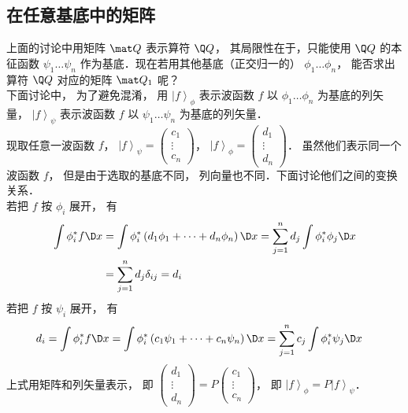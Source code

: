 \subsection{在任意基底中的矩阵}
上面的讨论中用矩阵 $\mat Q$ 表示算符 $\Q Q$， 其局限性在于，只能使用 $\Q Q$ 的本征函数 ${\psi _1}\dots{\psi _n}$ 作为基底．现在若用其他基底（正交归一的） ${\phi _1}\dots{\phi _n}$， 能否求出算符 $\Q Q$ 对应的矩阵 ${\mat Q_1}$ 呢？\\
下面讨论中， 为了避免混淆， 用 ${\left| f \right\rangle _\phi }$ 表示波函数 $f$ 以 ${\phi _1}\dots{\phi _n}$ 为基底的列矢量， ${\left| f \right\rangle _\psi }$ 表示波函数 $f$ 以 ${\psi _1}\dots{\psi _n}$ 为基底的列矢量．\\
现取任意一波函数 $f$，  ${\left| f \right\rangle _\psi } = \left( {\begin{aligned}
{{c_1}}\\
 \vdots \\
{{c_n}}
\end{aligned}} \right)$，   ${\left| f \right\rangle _\phi } = \left( {\begin{aligned}
{{d_1}}\\
 \vdots \\
{{d_n}}
\end{aligned}} \right)$． 虽然他们表示同一个波函数 $f$，  但是由于选取的基底不同， 列向量也不同．下面讨论他们之间的变换关系．\\
若把 $f$ 按 ${\phi _i}$ 展开， 有
\begin{equation}
\begin{aligned}
\int {\phi _i^*f   \D x} & = \int {\phi _i^*\left( {{d_1}{\phi _1} + \dots + {d_n}{\phi _n}} \right)   \D x}  = \sum\limits_{j = 1}^n {{d_j}} \int {\phi _i^*{\phi _j} \D x}  \\
&= \sum\limits_{j = 1}^n {{d_j}} {\delta _{ij}} = {d_i}
\end{aligned}
\end{equation}
若把 $f$ 按 $\psi _i$ 展开， 有
\begin{equation}
\begin{aligned}
{d_i} & = \int {\phi _i^*f   \D x}   = \int {\phi _i^*\left( {{c_1}{\psi _1} + \dots + {c_n}{\psi _n}} \right)   \D x} = \sum\limits_{j = 1}^n {{c_j}} \int {\phi _i^*{\psi _j} \D x}
\end{aligned}
\end{equation}
上式用矩阵和列矢量表示， 即 $\left( {\begin{aligned}
{{d_1}}\\
 \vdots \\
{{d_n}}
\end{aligned}} \right) = P\left( {\begin{aligned}
{{c_1}}\\
 \vdots \\
{{c_n}}
\end{aligned}} \right)$，  即 ${\left| f \right\rangle _\phi } = P{\left| f \right\rangle _\psi }$．\\
